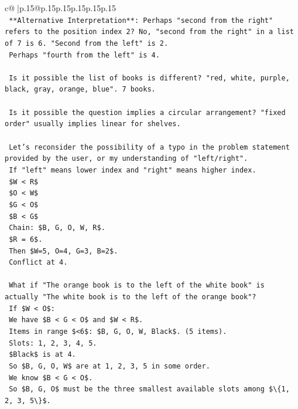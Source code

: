 \documentclass{article}
\begin{document}
{\begin{supertabular}{c@{$\;$}|p{.15\linewidth}@{}p{.15\linewidth}p{.15\linewidth}p{.15\linewidth}p{.15\linewidth}p{.15\linewidth}}
{{{\\ 
\texttt{    **Alternative Interpretation**: Perhaps "second from the right" refers to the position index 2? No, "second from the right" in a list of 7 is 6. "Second from the left" is 2.} \\
\texttt{    Perhaps "fourth from the left" is 4.} \\
\\ 
\texttt{    Is it possible the list of books is different? "red, white, purple, black, gray, orange, blue". 7 books.} \\
\\ 
\texttt{    Is it possible the question implies a circular arrangement? "fixed order" usually implies linear for shelves.} \\
\\ 
\texttt{    Let's reconsider the possibility of a typo in the problem statement provided by the user, or my understanding of "left/right".} \\
\texttt{    If "left" means lower index and "right" means higher index.} \\
\texttt{    \$W < R\$} \\
\texttt{    \$O < W\$} \\
\texttt{    \$G < O\$} \\
\texttt{    \$B < G\$} \\
\texttt{    Chain: \$B, G, O, W, R\$.} \\
\texttt{    \$R = 6\$.} \\
\texttt{    Then \$W=5, O=4, G=3, B=2\$.} \\
\texttt{    Conflict at 4.} \\
\\ 
\texttt{    What if "The orange book is to the left of the white book" is actually "The white book is to the left of the orange book"?} \\
\texttt{    If \$W < O\$:} \\
\texttt{    We have \$B < G < O\$ and \$W < R\$.} \\
\texttt{    Items in range \$<6\$: \$B, G, O, W, Black\$. (5 items).} \\
\texttt{    Slots: 1, 2, 3, 4, 5.} \\
\texttt{    \$Black\$ is at 4.} \\
\texttt{    So \$B, G, O, W\$ are at 1, 2, 3, 5 in some order.} \\
\texttt{    We know \$B < G < O\$.} \\
\texttt{    So \$B, G, O\$ must be the three smallest available slots among \$\textbackslash{}\{1, 2, 3, 5\textbackslash{}\}\$.} \\
}}}
\end{supertabular}}
\end{document}
